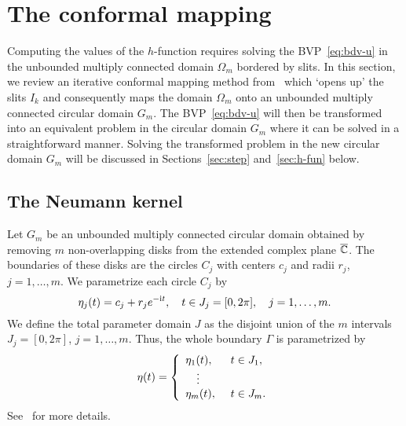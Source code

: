 \section{The conformal mapping}\label{sec:cm}

Computing the values of the $h$-function requires solving the BVP~\eqref{eq:bdv-u} in the unbounded multiply connected domain $\Omega_m$ bordered by slits.
In this section, we review an iterative conformal mapping method from~\cite{AST13,NG18} which `opens up' the slits $I_k$ and consequently maps the domain $\Omega_m$ onto an unbounded multiply connected circular domain $G_m$. 
The BVP~\eqref{eq:bdv-u} will then be transformed into an equivalent problem in the circular domain $G_m$ where it can be solved in a straightforward manner. Solving the transformed problem in the new circular domain $G_m$ will be discussed in Sections~\ref{sec:step} and~\ref{sec:h-fun} below. 

\subsection{The Neumann kernel}\label{sec:NK}

Let $G_m$ be an unbounded multiply connected circular domain obtained by removing $m$ non-overlapping disks from the extended complex plane $\overline{{\mathbb C}}$. The boundaries of these disks are the circles $C_j$ with centers $c_j$ and radii $r_j$, $j=1,\ldots,m$. 
We parametrize each circle $C_j$ by 
\begin{equation}\label{eq:eta-j}
\eta_j(t)=c_j+r_j e^{-\mathrm{i} t}, \quad t\in J_j=[0,2\pi], \quad j=1,\ldots,m.
\end{equation}
We define the total parameter domain $J$ as the disjoint union of the $m$ intervals $J_j=[0,2\pi]$, $j=1,\ldots,m$. Thus, the whole boundary $\Gamma$ is parametrized by
\begin{equation}\label{eq:eta}
\eta(t)= \left\{ \begin{array}{l@{\hspace{0.5cm}}l}
\eta_1(t),&t\in J_1, \\
\quad\vdots & \\
\eta_m(t),&t\in J_m.
\end{array}
\right.
\end{equation}
See~\cite{Nas-ETNA,NG18} for more details.

